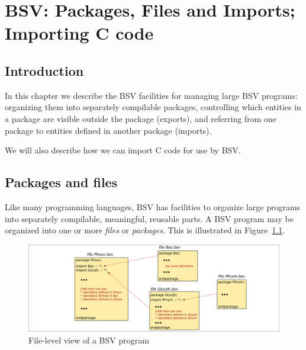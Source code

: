 

\chapter{BSV: Packages, Files and Imports; Importing C code}


\setcounter{page}{1}
\renewcommand{\thepage}{\arabic{chapter}-\arabic{page}}

\label{ch_Packages}


\section{Introduction}

In this chapter we describe the BSV facilities for managing large BSV
programs: organizing them into separately compilable packages,
controlling which entities in a package are visible outside the
package (exports), and referring from one package to entities defined
in another package (imports).

We will also describe how we can import C code for use by BSV.


\section{Packages and files}


Like many programming languages, BSV has facilities to organize large
programs into separately compilable, meaningful, reusable parts.  A
BSV program may be organized into one or more \emph{files} or
\emph{packages}.  This is illustrated in
Figure~\ref{Fig_BSV_program_structure}.
\begin{figure}[htbp]
  \centerline{\includegraphics[width=6in,angle=0]{Figures/Fig_BSV_program_structure}}
  \caption{\label{Fig_BSV_program_structure}
           File-level view of a BSV program}
\end{figure}

